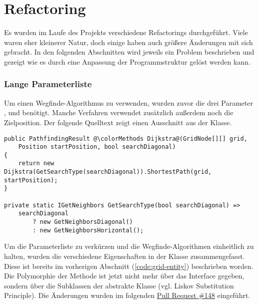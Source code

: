\part{Refactoring}
Es wurden im Laufe des Projekts verschiedene Refactorings durchgeführt.
Viele waren eher kleinerer Natur, doch einige haben auch größere Änderungen
mit sich gebracht.
In den folgenden Abschnitten wird jeweils ein Problem beschrieben und
gezeigt wie es durch eine Anpassung der Programmstruktur gelöst werden kann.

\section{Lange Parameterliste}
Um einen Wegfinde-Algorithmus zu verwenden, wurden zuvor die
drei Parameter ,  und
 benötigt. Manche Verfahren verwendet zusätzlich außerdem
noch die Zielposition. Der folgende Quelltext zeigt einen Ausschnitt aus der
 Klasse.
\begin{lstlisting}[caption={Die alte Verwendung der Wegfinde-Klassen},label={code:use-pathfinding}]
public PathfindingResult @\colorMethods Dijkstra@(GridNode[][] grid,
    Position startPosition, bool searchDiagonal)
{
    return new Dijkstra(GetSearchType(searchDiagonal)).ShortestPath(grid, startPosition);
}

private static IGetNeighbors GetSearchType(bool searchDiagonal) =>
    searchDiagonal
        ? new GetNeighborsDiagonal()
        : new GetNeighborsHorizontal();
\end{lstlisting}
Um die Parameterliste zu verkürzen und die Wegfinde-Algorithmen
einheitlich zu halten, wurden die verschiedene Eigenschaften in der Klasse
 zusammengefasst.
Diese ist bereits im vorherigen Abschnitt (\ref{code:grid-entity}) beschrieben worden.
Die Polymorphie der  Methode
ist jetzt nicht mehr über das Interface 
gegeben, sondern über die Subklassen der abstrakte Klasse
 (vgl. Liskov Substitution Principle).
Die Änderungen wurden im folgenden
\href{https://github.com/JensDll/pathfinding-visualization/pull/148}{Pull Request \#148}
eingeführt.

